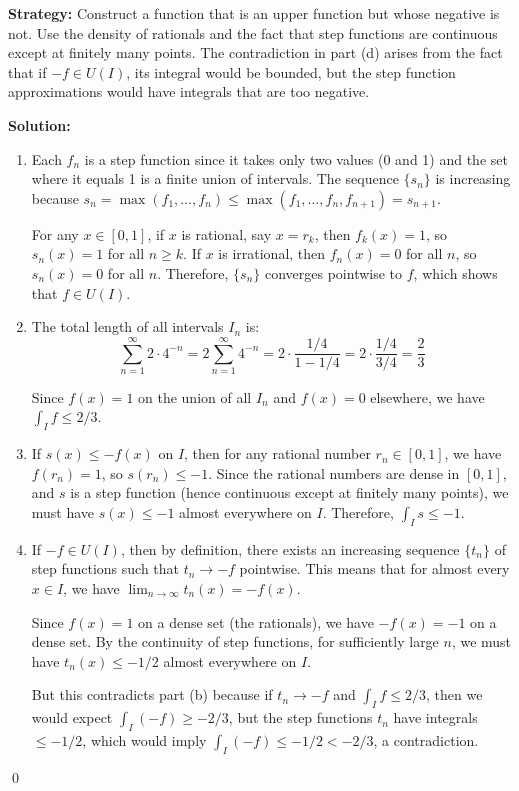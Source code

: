 \noindent\textbf{Strategy:} Construct a function that is an upper function but whose negative is not. Use the density of rationals and the fact that step functions are continuous except at finitely many points. The contradiction in part (d) arises from the fact that if $-f \in U(I)$, its integral would be bounded, but the step function approximations would have integrals that are too negative.

\bigskip\noindent\textbf{Solution:}
\begin{enumerate}[label=(\alph*)]
\item Each $f_n$ is a step function since it takes only two values (0 and 1) and the set where it equals 1 is a finite union of intervals. The sequence $\{s_n\}$ is increasing because $s_n = \max(f_1, \ldots, f_n) \leq \max(f_1, \ldots, f_n, f_{n+1}) = s_{n+1}$.

For any $x \in [0, 1]$, if $x$ is rational, say $x = r_k$, then $f_k(x) = 1$, so $s_n(x) = 1$ for all $n \geq k$. If $x$ is irrational, then $f_n(x) = 0$ for all $n$, so $s_n(x) = 0$ for all $n$. Therefore, $\{s_n\}$ converges pointwise to $f$, which shows that $f \in U(I)$.

\item The total length of all intervals $I_n$ is:
\[\sum_{n=1}^{\infty} 2 \cdot 4^{-n} = 2 \sum_{n=1}^{\infty} 4^{-n} = 2 \cdot \frac{1/4}{1 - 1/4} = 2 \cdot \frac{1/4}{3/4} = \frac{2}{3}\]

Since $f(x) = 1$ on the union of all $I_n$ and $f(x) = 0$ elsewhere, we have $\int_I f \leq 2/3$.

\item If $s(x) \leq -f(x)$ on $I$, then for any rational number $r_n \in [0, 1]$, we have $f(r_n) = 1$, so $s(r_n) \leq -1$. Since the rational numbers are dense in $[0, 1]$, and $s$ is a step function (hence continuous except at finitely many points), we must have $s(x) \leq -1$ almost everywhere on $I$. Therefore, $\int_I s \leq -1$.

\item If $-f \in U(I)$, then by definition, there exists an increasing sequence $\{t_n\}$ of step functions such that $t_n \to -f$ pointwise. This means that for almost every $x \in I$, we have $\lim_{n \to \infty} t_n(x) = -f(x)$.

Since $f(x) = 1$ on a dense set (the rationals), we have $-f(x) = -1$ on a dense set. By the continuity of step functions, for sufficiently large $n$, we must have $t_n(x) \leq -1/2$ almost everywhere on $I$.

But this contradicts part (b) because if $t_n \to -f$ and $\int_I f \leq 2/3$, then we would expect $\int_I (-f) \geq -2/3$, but the step functions $t_n$ have integrals $\leq -1/2$, which would imply $\int_I (-f) \leq -1/2 < -2/3$, a contradiction.
\end{enumerate}\qed
